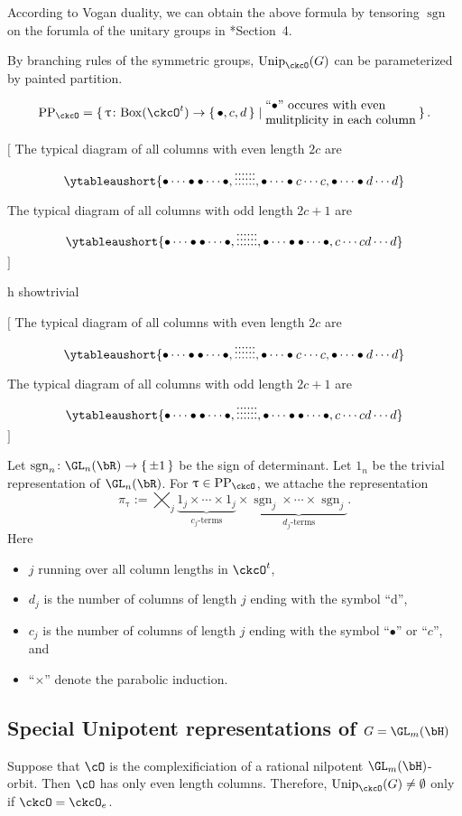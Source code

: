 \documentclass[12pt,a4paper]{amsart}
\let\ytb=\ytableaushort
\newcommand{\trivial}[2][]{\if\relax\detokenize{#1}\relax
  {%
      \color{orange} \vspace{0em} $[$  #2 $]$
      \color{black}
  }
  \else
\ifx#1h
\ifcsname showtrivial\endcsname
{%
    \color{orange} \vspace{0em}  $[$ #2 $]$
    \color{black}
}
\fi
\else {\red Wrong argument!} \fi
\fi
}
\newcommand{\sgn}{\operatorname{sgn}}
\numberwithin{equation}{section}
\theoremstyle{remark}
\def\Unip{\mathrm{Unip}}
\def\PP#1{\mathrm{PP}_{#1}}
\def\BOX#1{\mathrm{Box}(#1)}
\begin{document}
According to Vogan duality,  we can obtain the above formula by tensoring $\sgn$
on the forumla of the unitary groups in \cite{BV.W}*{Section~4}.

By branching rules of the symmetric groups,  $\Unip_{\ckcO}(G)$ can be parameterized by painted partition. 

\[
\PP{\ckcO} = \set{\uptau\colon \BOX{\ckcO^t}\rightarrow \set{\bullet,c,d}|
  \begin{minipage}{12em} ``$\bullet$'' occures with even\\ mulitplicity in each column
  \end{minipage}
}.  
\]
\trivial{
The typical diagram of all columns with even length $2c$ are
\[
\ytb{\bullet\cdots\bullet\bullet\cdots\bullet,\vdots\vdots\vdots\vdots\vdots\vdots,
\bullet\cdots\bullet c\cdots c,
\bullet\cdots\bullet d\cdots d
}  
\]

The typical diagram of all columns with odd length $2c+1$ are
\[
\ytb{\bullet\cdots\bullet\bullet\cdots\bullet,\vdots\vdots\vdots\vdots\vdots\vdots,
\bullet\cdots\bullet \bullet\cdots\bullet ,
c\cdots c d\cdots d
}  
\]
}

Let $\sgn_n\colon \GL_n(\bR)\rightarrow \set{\pm 1}$ be the sign of determinant. 
Let $1_n$ be the trivial representation of $\GL_n(\bR)$. 
For $\uptau\in \PP{\ckcO}$, we attache the representation 
\begin{equation}\label{eq:u.GLR}
\pi_\uptau := 
\bigtimes_{j} \underbrace{1_j \times \cdots \times 1_j}_{c_j\text{-terms}}\times
\underbrace{\sgn_j \times \cdots \times {\sgn_j} }_{d_j\text{-terms}}.
\end{equation}
Here 
\begin{itemize}
  \item 
$j$ running over all column lengths in $\ckcO^t$, 
\item $d_j$ is the number of
columns of length $j$ ending with the symbol ``d'',
\item  $c_j$ is the number of
columns of length $j$ ending with the symbol ``$\bullet$'' or ``$c$'', and 
\item  ``$\times$'' denote the parabolic induction.  
\end{itemize}

\subsection{Special Unipotent representations of $G=\GL_{m}(\bH)$}

Suppose that $\cO$ is the complexificiation of a rational nilpotent $\GL_{m}(\bH)$-orbit. 
Then $\cO$ has only even length columns. 
Therefore, $\Unip_\ckcO(G) \neq\emptyset$ only if $\ckcO = \ckcO_e$. 
\end{document}
